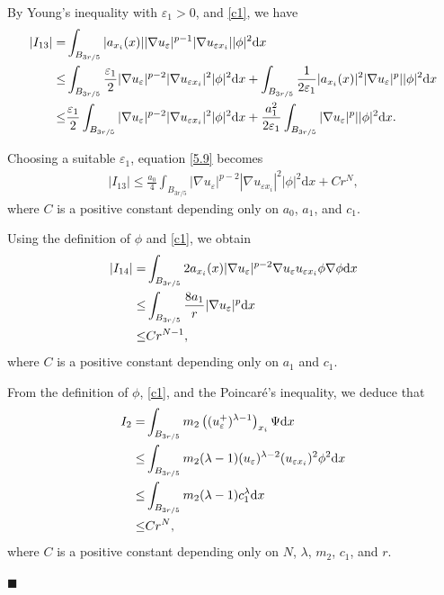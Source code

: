 \documentclass[onecolumn]{autart}
\newenvironment{proof}{{\it Proof: \enspace}}{\hfill $\blacksquare$\par}
\begin{document}
\begin{proof}
		
		By Young's inequality with $\varepsilon_1>0$, and \eqref{c1}, we have
		\begin{align}
			|I_{13}|
			=
			&\int_{B_{3r/5}} |a_{x_i}(x)| |\nabla u_\varepsilon|^{p-1} | \nabla u_{\varepsilon x_i}| |\phi|^2\mathrm{d}x
			\notag\\ \leq
			& \int_{B_{3r/5}} \frac{\varepsilon_1}{2} |\nabla u_\varepsilon|^{p-2} | \nabla u_{\varepsilon x_i}|^2 |\phi|^2\mathrm{d}x +  \int_{B_{3r/5}}\frac{1}{2\varepsilon_1}| a_{x_i}(x)|^2 |\nabla u_\varepsilon|^p |  |\phi|^2\mathrm{d}x
			\notag\\ \leq
			& \frac{\varepsilon_1}{2}\int_{B_{3r/5}}|\nabla u_\varepsilon|^{p-2} | \nabla u_{\varepsilon x_i}|^2 |\phi|^2\mathrm{d}x +  \frac{a_1^2}{2\varepsilon_1}\int_{B_{3r/5}} |\nabla u_\varepsilon|^p |  |\phi|^2\mathrm{d}x.	\label{5.9}
		\end{align}
		
		Choosing a suitable $\varepsilon_1$, equation \eqref{5.9} becomes
		\begin{align}\label{5.10}
			|I_{13}| \leq \frac{a_0}{4}\int_{B_{3r/5}}|\nabla u_\varepsilon|^{p-2} | \nabla u_{\varepsilon x_i}|^2 |\phi|^2\mathrm{d}x + Cr^N ,	
		\end{align}
		where $C$ is a positive  constant depending  only on  $a_0$, $a_1$, and $c_1$.
		
		Using the definition of $\phi$ and \eqref{c1}, we obtain
		\begin{align}
			|I_{14}|
			=
			&\int_{B_{3r/5}} 2a_{x_i}(x) |\nabla u_\varepsilon|^{p-2} \nabla u_{\varepsilon} u_{\varepsilon x_i}\phi\nabla \phi \mathrm{d}x
			\notag\\ \leq
			& \int_{B_{3r/5}} \frac{8a_1}{r} |\nabla u_\varepsilon|^p \mathrm{d}x
			\notag\\\leq
			& Cr^{N-1},\label{5.11}
		\end{align}
		{where $C$ is a positive  constant depending  only on  $a_1$ and $c_1$.}	
		
		From the definition of $\phi$, \eqref{c1}, and the Poincar\'e's inequality, we deduce that
		\begin{align}
			I_2
			=
			&\int_{B_{3r/5}} m_2\left( (u_\varepsilon^+)^{\lambda-1} \right)_{x_i} \Psi  \mathrm{d}x
			\notag\\ \leq
			& \int_{B_{3r/5}} m_2(\lambda-1) (u_\varepsilon)^{\lambda-2} (u_{\varepsilon x_i})^2 \phi^2  \mathrm{d}x
			\notag\\ \leq
			& \int_{B_{3r/5}} m_2(\lambda-1)c_1^\lambda  \mathrm{d}x
			\notag\\ \leq
			&Cr^N,\label{5.12}
		\end{align} 	
		where $C$ is a positive  constant depending  only on $N$, $\lambda$,  $m_2$, $c_1$,  and $r$.
		

\end{proof}
\end{document}
